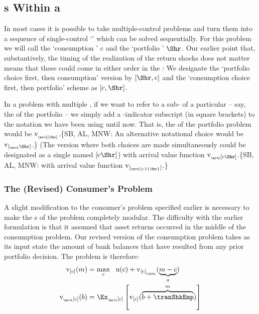 \documentclass[titlepage, headings=optiontotocandhead]{econtex}
\begin{document}
\hypertarget{stages-within-a-period}{}
\subsection{{\Stg}s Within a {\Interval}}\label{subsec:stageswithin}

In most cases it is possible to take multiple-control problems and turn them into a sequence of single-control `{\stgs}' which can be solved sequentially.  For this problem we will call the `consumption {\stg}' $\mathrm{c}$ and the `portfolio {\stg}' $\Shr$.  Our earlier point that, substantively, the timing of the realization of the return shocks does not matter means that these could come in either order in the {\interval}: We designate the `portfolio choice first, then consumption' version by $[\Shr,\mathrm{c}]$ and the `consumption choice first, then portfolio' scheme as $[\mathrm{c},\Shr]$. 

In a problem with multiple {\stgs}, if we want to refer to a sub-{\move} of a particular {\stg} -- say, the {\Arrival} {\move} of the portfolio {\stg} -- we simply add a {\stg}-indicator subscript (in square brackets) to the notation we have been using until now.  That is, the {\Arrival} {\stg} of the portfolio problem would be $\mathrm{v}_{_\arvl[\Shr]}$.\{SB, AL, MNW: An alternative notational choice would be $\mathrm{v}_{[_\arvl\Shr]}$.\}  (The version where both choices are made simultaneously could be designated as a single {\stg} named $[{\mathrm{c}}{\Shr}]$) with arrival value function $\mathrm{v}_{_\arvl[{\mathrm{c}}{\Shr}]}$.\{SB, AL, MNW: with arrival value function $\mathrm{v}_{[_\arvl{\mathrm{c}}{\Shr}]}.$\}

\hypertarget{revised-consumers-problem}{}
\subsubsection{The (Revised) Consumer's Problem}\label{subsubsec:revised-consumers-problem}

A slight modification to the consumer's problem specified earlier is necessary to make the {\stg}s of the problem completely modular.  The difficulty with the earlier formulation is that it assumed that asset returns occurred in the middle {\move} of the consumption problem.  Our revised version of the consumption problem takes as its input state the amount of bank balances that have resulted from any prior portfolio decision.  The problem is therefore:
  \begin{equation}\begin{gathered}\begin{aligned}
 \mathrm{v}_{[\mathrm{c}]}(m) & =  \max_{c} ~~ \mathrm{u}(c)+  \mathrm{v}_{[\mathrm{c}]_{_\cntn}}(\underbrace{m-c}_{a})             
\\    \mathrm{v}_{_\arvl[\mathrm{c}]}(b) & = \Ex_{_\arvl[\mathrm{c}]}\left[\mathrm{v}_{[c]}(\overbrace{b+\tranShkEmp}^{m})\right] \label{eq:vBalances}
      \end{aligned}\end{gathered}\end{equation}
\end{document}
